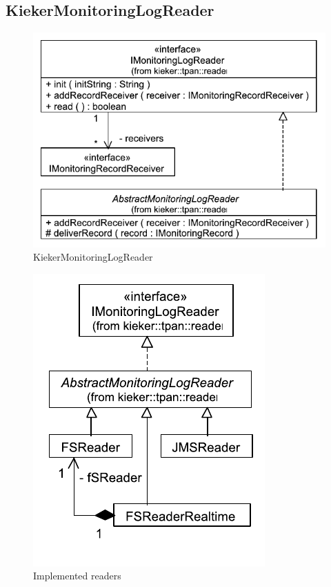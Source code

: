 \documentclass[12pt,journal,a4paper,twocolumn,final,oneside]{IEEEtran}%
\begin{document}
\subsection{KiekerMonitoringLogReader}

\begin{figure}[h]\centering
\includegraphics[scale=0.55]{figures/model/kieker_KiekerMonitoringLogReader}%
\caption{KiekerMonitoringLogReader}
\end{figure}

\begin{figure}[h]\centering
\includegraphics[scale=0.55]{figures/model/kieker_readerimpls}%
\caption{Implemented readers}
\end{figure}
\end{document}
